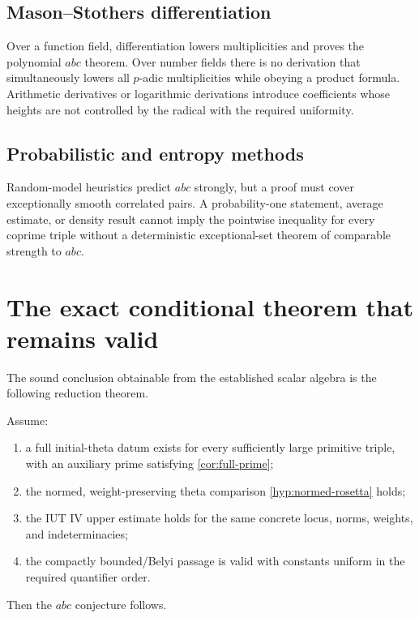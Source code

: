 \subsection{Mason--Stothers differentiation}

Over a function field, differentiation lowers multiplicities and proves the polynomial $abc$ theorem.  Over number fields there is no derivation that simultaneously lowers all $p$-adic multiplicities while obeying a product formula.  Arithmetic derivatives or logarithmic derivations introduce coefficients whose heights are not controlled by the radical with the required uniformity.

\subsection{Probabilistic and entropy methods}

Random-model heuristics predict $abc$ strongly, but a proof must cover exceptionally smooth correlated pairs.  A probability-one statement, average estimate, or density result cannot imply the pointwise inequality for every coprime triple without a deterministic exceptional-set theorem of comparable strength to $abc$.

\section{The exact conditional theorem that remains valid}

The sound conclusion obtainable from the established scalar algebra is the following reduction theorem.

\begin{theorem}\label{thm:exact-reduction}
Assume:
\begin{enumerate}[label=(H\arabic*)]
\item a full initial-theta datum exists for every sufficiently large primitive triple, with an auxiliary prime satisfying \cref{cor:full-prime};
\item the normed, weight-preserving theta comparison \cref{hyp:normed-rosetta} holds;
\item the IUT IV upper estimate holds for the same concrete locus, norms, weights, and indeterminacies;
\item the compactly bounded/Belyi passage is valid with constants uniform in the required quantifier order.
\end{enumerate}
Then the $abc$ conjecture follows.
\end{theorem}

